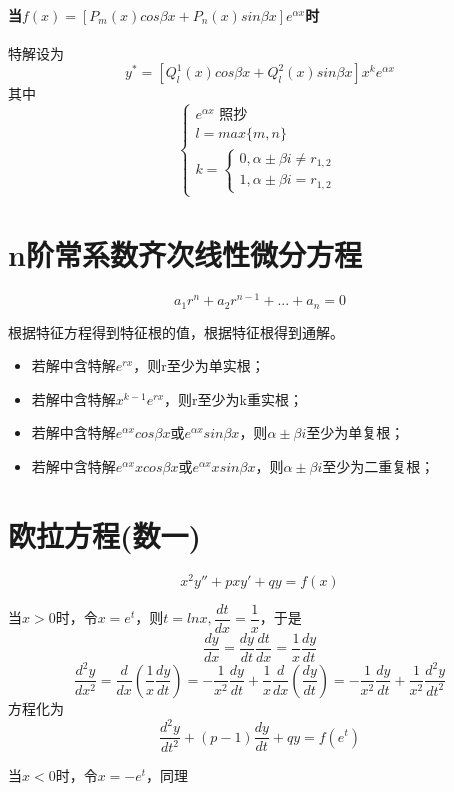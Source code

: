 \paragraph{当\(f(x) = [P_m(x)cos\beta x + P_n(x)sin\beta x]e^{\alpha x}\)时}
特解设为
\[y^* = [Q_l^1(x)cos\beta x + Q_l^2(x)sin\beta x]x^ke^{\alpha x}\]
其中
\[\begin{cases}
    e^{\alpha x}\text{ 照抄} \\ 
    l = max\{m, n\} \\ 
    k = \begin{cases}
        0, \alpha \pm \beta i \neq r_{1,2} \\ 
        1, \alpha \pm \beta i = r_{1,2}
    \end{cases}
\end{cases}\]


\section{n阶常系数齐次线性微分方程}
\[a_1r^n + a_2r^{n - 1} + ... + a_n = 0\]

根据特征方程得到特征根的值，根据特征根得到通解。
\begin{itemize}
    \item 若解中含特解\(e^{rx}\)，则r至少为单实根；
    \item 若解中含特解\(x^{k - 1}e^{rx}\)，则r至少为k重实根；
    \item 若解中含特解\(e^{\alpha x}cos\beta x\)或\(e^{\alpha x}sin\beta x\)，则\(\alpha \pm \beta i\)至少为单复根；
    \item 若解中含特解\(e^{\alpha x}xcos\beta x\)或\(e^{\alpha x}xsin\beta x\)，则\(\alpha \pm \beta i\)至少为二重复根；
\end{itemize}


\section{欧拉方程(数一)}
\[x^2y'' + pxy' + qy = f(x)\]

当\(x > 0\)时，令\(x = e^t\)，则\(t = lnx, \dfrac{dt}{dx} = \dfrac{1}{x}\)，于是
\[\dfrac{dy}{dx} = \dfrac{dy}{dt} \dfrac{dt}{dx} = \dfrac{1}{x} \dfrac{dy}{dt}\]
\[\dfrac{d^2y}{dx^2} = \dfrac{d}{dx}(\dfrac{1}{x}\dfrac{dy}{dt}) = -\dfrac{1}{x^2}\dfrac{dy}{dt} + \dfrac{1}{x}\dfrac{d}{dx}(\dfrac{dy}{dt}) = -\dfrac{1}{x^2}\dfrac{dy}{dt} + \dfrac{1}{x^2}\dfrac{d^2y}{dt^2}\]
方程化为\[\dfrac{d^2y}{dt^2} + (p - 1)\dfrac{dy}{dt} + qy = f(e^t)\]

当\(x < 0\)时，令\(x = -e^t\)，同理


